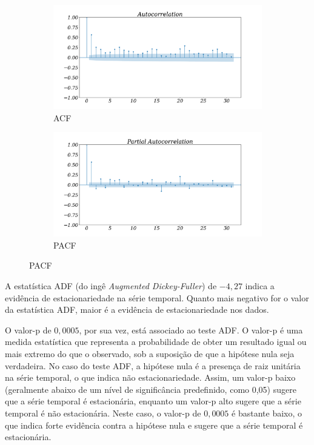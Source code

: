 \begin{figure}[!htpb]
	\centering
	\caption{Autocorrelação e Autocorrelação parcial}
	\label{fig:acf}
	
	
	\begin{subfigure}{0.9\textwidth}
		\includegraphics[width=\linewidth]{Resultados/Figuras/acf} 
		\caption{ACF}\label{fig:acfa}
	\end{subfigure}
	

	\begin{subfigure}{0.9\textwidth}
		\includegraphics[width=\linewidth]{Resultados/Figuras/pacf}
		\caption{PACF}\label{fig:pacf}
	\end{subfigure}
	
\end{figure}

A estatística ADF (do ingê \textit{Augmented Dickey-Fuller}) de $-4,27$ indica a evidência de estacionariedade na série temporal. Quanto mais negativo for o valor da estatística ADF, maior é a evidência de estacionariedade nos dados.

O valor-p de $0,0005$, por sua vez, está associado ao teste ADF. O valor-p é uma medida estatística que representa a probabilidade de obter um resultado igual ou mais extremo do que o observado, sob a suposição de que a hipótese nula seja verdadeira. No caso do teste ADF, a hipótese nula é a presença de raiz unitária na série temporal, o que indica não estacionariedade. Assim, um valor-p baixo (geralmente abaixo de um nível de significância predefinido, como 0,05) sugere que a série temporal é estacionária, enquanto um valor-p alto sugere que a série temporal é não estacionária. Neste caso, o valor-p de $0,0005$ é bastante baixo, o que indica forte evidência contra a hipótese nula e sugere que a série temporal é estacionária.

